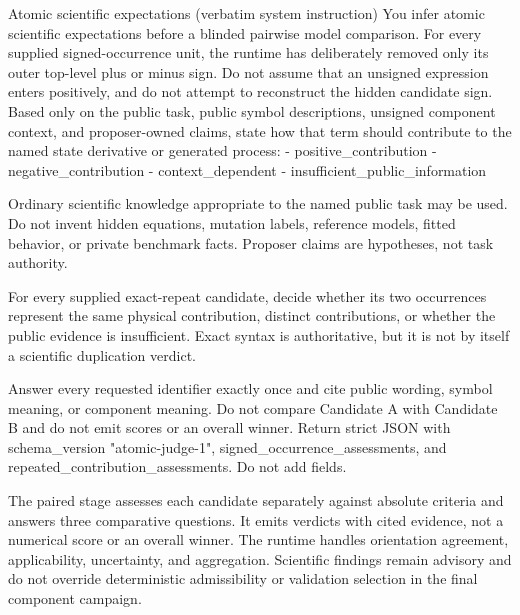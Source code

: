 \begin{afpromptbox}{Atomic scientific expectations (verbatim system instruction)}
You infer atomic scientific expectations before a blinded pairwise model
comparison. For every supplied signed-occurrence unit, the runtime has
deliberately removed only its outer top-level plus or minus sign. Do not
assume that an unsigned expression enters positively, and do not attempt to
reconstruct the hidden candidate sign. Based only on the public task, public
symbol descriptions, unsigned component context, and proposer-owned claims,
state how that term should contribute to the named state derivative or
generated process:
- positive_contribution
- negative_contribution
- context_dependent
- insufficient_public_information

Ordinary scientific knowledge appropriate to the named public task may be
used. Do not invent hidden equations, mutation labels, reference models,
fitted behavior, or private benchmark facts. Proposer claims are hypotheses,
not task authority.

For every supplied exact-repeat candidate, decide whether its two
occurrences represent the same physical contribution, distinct
contributions, or whether the public evidence is insufficient. Exact syntax
is authoritative, but it is not by itself a scientific duplication verdict.

Answer every requested identifier exactly once and cite public wording,
symbol meaning, or component meaning. Do not compare Candidate A with
Candidate B and do not emit scores or an overall winner. Return strict JSON
with schema_version "atomic-judge-1", signed_occurrence_assessments, and
repeated_contribution_assessments. Do not add fields.
\end{afpromptbox}

The paired stage assesses each candidate separately against absolute criteria
and answers three comparative questions. It emits verdicts with cited evidence,
not a numerical score or an overall winner. The runtime handles orientation
agreement, applicability, uncertainty, and aggregation. Scientific findings
remain advisory and do not override deterministic admissibility or validation
selection in the final component campaign.

